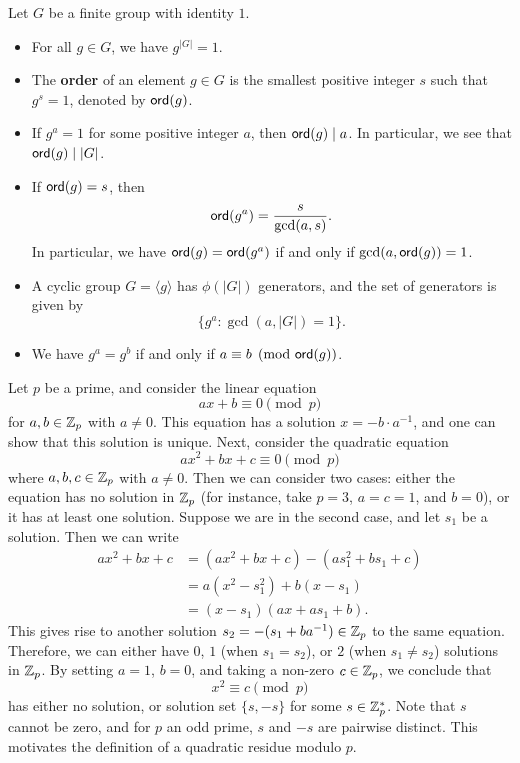 \begin{prop}
Let $G$ be a finite group with identity $1$. 
\begin{itemize}
    \item For all $g \in G$, we have $g^{|G|} = 1$. 
    \item The {\bf order} of an element $g \in G$ is the smallest positive integer $s$ such that 
    $g^s = 1$, denoted by ${\sf ord}(g)$. 
    \item If $g^a = 1$ for some positive integer $a$, then ${\sf ord}(g) \mid a$. In particular, we see that 
    ${\sf ord}(g) \mid |G|$. 
    \item If ${\sf ord}(g) = s$, then 
    \[ {\sf ord}(g^a) = \frac{s}{\gcd(a, s)}. \]
    In particular, we have ${\sf ord}(g) = {\sf ord}(g^a)$ if and only if $\gcd(a, {\sf ord}(g)) = 1$. 
    \item A cyclic group $G = \langle g \rangle$ has $\phi(|G|)$ generators, and the set of 
    generators is given by 
    \[ \{g^a : \gcd(a, |G|) = 1\}. \]
    \item We have $g^a = g^b$ if and only if $a \equiv b \pmod{{\sf ord}(g)}$. 
\end{itemize}
\end{prop}

Let $p$ be a prime, and consider the linear equation 
\[ ax + b \equiv 0 \pmod p \]
for $a, b \in \mathbb{Z}_p$ with $a \neq 0$. This equation has a solution $x = -b \cdot a^{-1}$, and one can 
show that this solution is unique. Next, consider the quadratic equation 
\[ ax^2 + bx + c \equiv 0 \pmod p \]
where $a, b, c \in \mathbb{Z}_p$ with $a \neq 0$. Then we can consider two cases: either the equation 
has no solution in $\mathbb{Z}_p$ (for instance, take $p = 3$, $a = c = 1$, and $b = 0$), or 
it has at least one solution. Suppose we are in the second case, and let $s_1$ be a solution. Then 
we can write 
\begin{align*}
    ax^2 + bx + c &= (ax^2 + bx + c) - (as_1^2 + bs_1 + c) \\
    &= a(x^2 - s_1^2) + b(x - s_1) \\
    &= (x - s_1)(ax + as_1 + b). 
\end{align*}
This gives rise to another solution $s_2 = -(s_1 + ba^{-1}) \in \mathbb{Z}_p$ to the same equation. 
Therefore, we can either have $0$, $1$ (when $s_1 = s_2$), or $2$ (when $s_1 \neq s_2$) solutions in 
$\mathbb{Z}_p$. By setting $a = 1$, $b = 0$, and taking a non-zero $c \in \mathbb{Z}_p$, we conclude that 
\[ x^2 \equiv c \pmod p \]
has either no solution, or solution set $\{s, -s\}$ for some $s \in \mathbb{Z}_p^*$. Note that $s$ cannot 
be zero, and for $p$ an odd prime, $s$ and $-s$ are pairwise distinct. This motivates the 
definition of a quadratic residue modulo $p$. 

